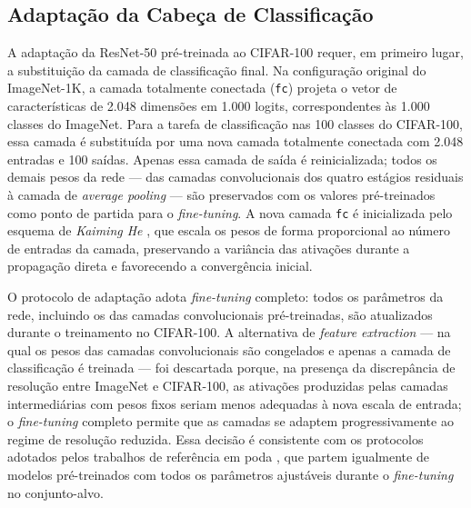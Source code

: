 \subsection{Adaptação da Cabeça de Classificação}\label{subsec:adaptacao_cabeca}

A adaptação da ResNet-50 pré-treinada ao CIFAR-100 requer, em primeiro lugar, a substituição da camada de classificação final. Na configuração original do ImageNet-1K, a camada totalmente conectada (\texttt{fc}) projeta o vetor de características de 2.048 dimensões em 1.000 logits, correspondentes às 1.000 classes do ImageNet. Para a tarefa de classificação nas 100 classes do CIFAR-100, essa camada é substituída por uma nova camada totalmente conectada com 2.048 entradas e 100 saídas. Apenas essa camada de saída é reinicializada; todos os demais pesos da rede --- das camadas convolucionais dos quatro estágios residuais à camada de \textit{average pooling} --- são preservados com os valores pré-treinados como ponto de partida para o \textit{fine-tuning}. A nova camada \texttt{fc} é inicializada pelo esquema de \textit{Kaiming He} \cite{He2016}, que escala os pesos de forma proporcional ao número de entradas da camada, preservando a variância das ativações durante a propagação direta e favorecendo a convergência inicial.

O protocolo de adaptação adota \textit{fine-tuning} completo: todos os parâmetros da rede, incluindo os das camadas convolucionais pré-treinadas, são atualizados durante o treinamento no CIFAR-100. A alternativa de \textit{feature extraction} --- na qual os pesos das camadas convolucionais são congelados e apenas a camada de classificação é treinada --- foi descartada porque, na presença da discrepância de resolução entre ImageNet e CIFAR-100, as ativações produzidas pelas camadas intermediárias com pesos fixos seriam menos adequadas à nova escala de entrada; o \textit{fine-tuning} completo permite que as camadas se adaptem progressivamente ao regime de resolução reduzida. Essa decisão é consistente com os protocolos adotados pelos trabalhos de referência em poda \cite{Han2015, Li2017}, que partem igualmente de modelos pré-treinados com todos os parâmetros ajustáveis durante o \textit{fine-tuning} no conjunto-alvo.


